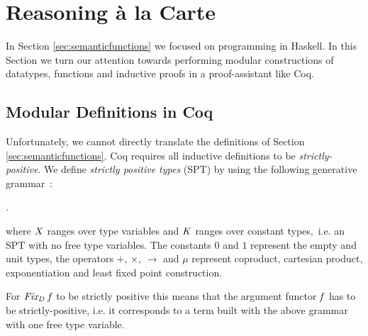 \section{Reasoning \`{a} la Carte}
\label{sec:reasoning}

In Section \ref{sec:semanticfunctions} we focused on programming in
Haskell. In this Section we turn our attention towards performing
modular constructions of datatypes, functions and inductive proofs
in a proof-assistant like Coq.

\subsection{Modular Definitions in Coq}


Unfortunately, we cannot directly translate the definitions of Section
\ref{sec:semanticfunctions}. Coq requires all inductive definitions to
be \emph{strictly-positive}. We define \emph{strictly positive types}
(SPT) by using the following generative grammar~\cite{containers}:
\begin{hscode}\SaveRestoreHook
{}%
%
%
\>[3]{}\tau\mathbin{::=}\mid {}\mid {}\mid \tau\mathbin{+}\tau\mid \tau\times\tau\mid {}\to \tau\mid {}.\tau{}\<[E]%
\ColumnHook
\end{hscode}\resethooks
where \ensuremath{\Conid{X}} ranges over type variables and \ensuremath{\Conid{K}} ranges over constant
types,~i.e. an SPT with no free type variables. The constants \ensuremath{\mathrm{0}} and
\ensuremath{\mathrm{1}} represent the empty and unit types, the operators \ensuremath{\mathbin{+}}, \ensuremath{\times}, \ensuremath{\to }
and \ensuremath{\mu} represent coproduct, cartesian product, exponentiation
and least fixed point construction.

For \ensuremath{\Varid{Fix_{D}}\;\Varid{f}} to be strictly positive this means that the argument
functor \ensuremath{\Varid{f}} has to be strictly-positive, i.e. it corresponds to a term
built with the above grammar with one free type variable.



